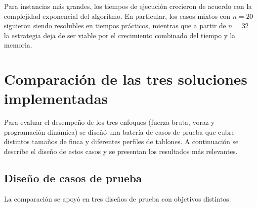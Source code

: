 \documentclass[12pt,a4paper]{article}
\begin{document}
Para instancias m\'as grandes, los tiempos de ejecuci\'on crecieron de acuerdo con la complejidad exponencial del algoritmo. En particular, los casos mixtos con \(n=20\) siguieron siendo resolubles en tiempos pr\'acticos, mientras que a partir de \(n=32\) la estrategia deja de ser viable por el crecimiento combinado del tiempo y la memoria.

\section{Comparaci\'on de las tres soluciones implementadas}

Para evaluar el desempe\~no de los tres enfoques (fuerza bruta, voraz y programaci\'on din\'amica) se dise\~n\'o una bater\'ia de casos de prueba que cubre distintos tama\~nos de finca y diferentes perfiles de tablones. A continuaci\'on se describe el dise\~no de estos casos y se presentan los resultados m\'as relevantes.

\subsection{Dise\~no de casos de prueba}

La comparaci\'on se apoy\'o en tres dise\~nos de prueba con objetivos distintos:
\end{document}
